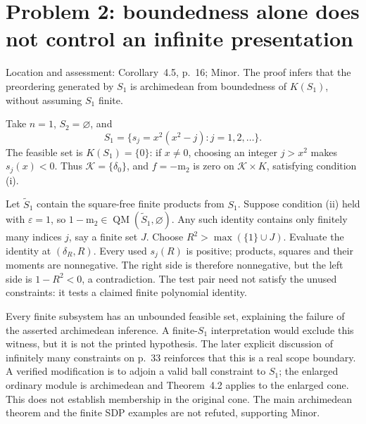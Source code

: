 \documentclass[10pt]{article}
\begin{document}
\section*{Problem 2: boundedness alone does not control an infinite presentation}
Location and assessment: Corollary 4.5, p. 16; Minor. The proof infers that the preordering generated by \(S_1\) is archimedean from boundedness of \(K(S_1)\), without assuming \(S_1\) finite.\par
Take \(n=1\), \(S_2=\varnothing\), and \[S_1=\{s_j=x^2(x^2-j):j=1,2,\ldots\}.\] The feasible set is \(K(S_1)=\{0\}\): if \(x\ne0\), choosing an integer \(j>x^2\) makes \(s_j(x)<0\). Thus \(\mathcal K=\{\delta_0\}\), and \(f=-\mathrm{m}_2\) is zero on \(\mathcal K\times K\), satisfying condition (i).\par
Let \(\widetilde S_1\) contain the square-free finite products from \(S_1\). Suppose condition (ii) held with \(\varepsilon=1\), so \(1-\mathrm{m}_2\in\operatorname{QM}(\widetilde S_1,\varnothing)\). Any such identity contains only finitely many indices \(j\), say a finite set \(J\). Choose \(R^2>\max(\{1\}\cup J)\). Evaluate the identity at \((\delta_R,R)\). Every used \(s_j(R)\) is positive; products, squares and their moments are nonnegative. The right side is therefore nonnegative, but the left side is \(1-R^2<0\), a contradiction. The test pair need not satisfy the unused constraints: it tests a claimed finite polynomial identity.\par
Every finite subsystem has an unbounded feasible set, explaining the failure of the asserted archimedean inference. A finite-\(S_1\) interpretation would exclude this witness, but it is not the printed hypothesis. The later explicit discussion of infinitely many constraints on p. 33 reinforces that this is a real scope boundary. A verified modification is to adjoin a valid ball constraint to \(S_1\); the enlarged ordinary module is archimedean and Theorem 4.2 applies to the enlarged cone. This does not establish membership in the original cone. The main archimedean theorem and the finite SDP examples are not refuted, supporting Minor.\par
\end{document}
